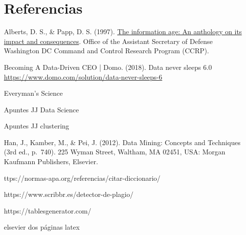 \documentclass[3p,twocolumn]{elsarticle}
\begin{document}
\section{Referencias}
\renewcommand{\section}[2]{}
\begin{thebibliography}{X}

 Alberts, D. S., \& Papp, D. S. (1997). \href{http://www.dodccrp.org/files/Alberts_Anthology_I.pdf} {The information age: An anthology on its impact and consequences}. Office of the Assistant Secretary of Defense Washington DC Command and Control Research Program (CCRP).

 Becoming A Data-Driven CEO | Domo. (2018). Data never sleeps 6.0 \href{https://www.domo.com/solution/data-never-sleeps-6} {https://www.domo.com/solution/data-never-sleeps-6}

 Everyman's Science

 Apuntes JJ Data Science

 Apuntes JJ clustering



Han, J., Kamber, M., \& Pei, J. (2012). Data Mining: Concepts and
Techniques (3rd ed., p.~740). 225 Wyman Street, Waltham, MA 02451, USA:
Morgan Kaufmann Publishers, Elsevier.

\end{thebibliography}

\section{Ayuda}

https://normas-apa.org/referencias/citar-diccionario/

https://www.scribbr.es/detector-de-plagio/

https://tablesgenerator.com/

elsevier dos páginas latex
\end{document}
